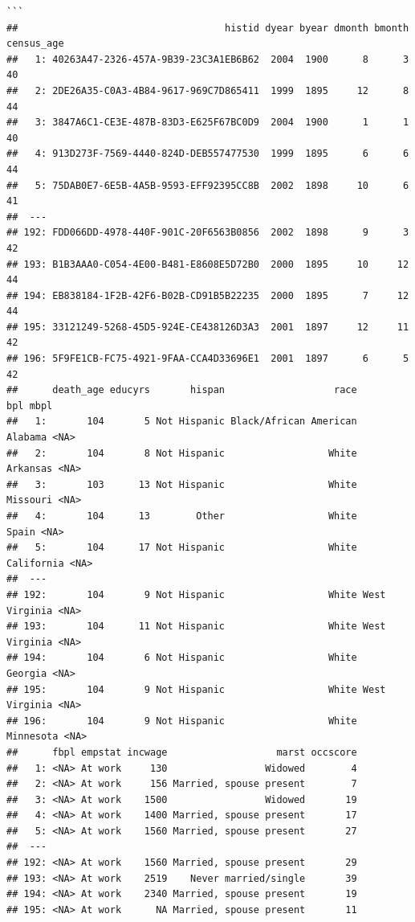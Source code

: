 \documentclass[]{book}
\begin{document}
\begin{verbatim}
```
##                                    histid dyear byear dmonth bmonth census_age
##   1: 40263A47-2326-457A-9B39-23C3A1EB6B62  2004  1900      8      3         40
##   2: 2DE26A35-C0A3-4B84-9617-969C7D865411  1999  1895     12      8         44
##   3: 3847A6C1-CE3E-487B-83D3-E625F67BC0D9  2004  1900      1      1         40
##   4: 913D273F-7569-4440-824D-DEB557477530  1999  1895      6      6         44
##   5: 75DAB0E7-6E5B-4A5B-9593-EFF92395CC8B  2002  1898     10      6         41
##  ---                                                                          
## 192: FDD066DD-4978-440F-901C-20F6563B0856  2002  1898      9      3         42
## 193: B1B3AAA0-C054-4E00-B481-E8608E5D72B0  2000  1895     10     12         44
## 194: EB838184-1F2B-42F6-B02B-CD91B5B22235  2000  1895      7     12         44
## 195: 33121249-5268-45D5-924E-CE438126D3A3  2001  1897     12     11         42
## 196: 5F9FE1CB-FC75-4921-9FAA-CCA4D33696E1  2001  1897      6      5         42
##      death_age educyrs       hispan                   race           bpl mbpl
##   1:       104       5 Not Hispanic Black/African American       Alabama <NA>
##   2:       104       8 Not Hispanic                  White      Arkansas <NA>
##   3:       103      13 Not Hispanic                  White      Missouri <NA>
##   4:       104      13        Other                  White         Spain <NA>
##   5:       104      17 Not Hispanic                  White    California <NA>
##  ---                                                                         
## 192:       104       9 Not Hispanic                  White West Virginia <NA>
## 193:       104      11 Not Hispanic                  White West Virginia <NA>
## 194:       104       6 Not Hispanic                  White       Georgia <NA>
## 195:       104       9 Not Hispanic                  White West Virginia <NA>
## 196:       104       9 Not Hispanic                  White     Minnesota <NA>
##      fbpl empstat incwage                   marst occscore
##   1: <NA> At work     130                 Widowed        4
##   2: <NA> At work     156 Married, spouse present        7
##   3: <NA> At work    1500                 Widowed       19
##   4: <NA> At work    1400 Married, spouse present       17
##   5: <NA> At work    1560 Married, spouse present       27
##  ---                                                      
## 192: <NA> At work    1560 Married, spouse present       29
## 193: <NA> At work    2519    Never married/single       39
## 194: <NA> At work    2340 Married, spouse present       19
## 195: <NA> At work      NA Married, spouse present       11

\end{verbatim}
\end{document}
